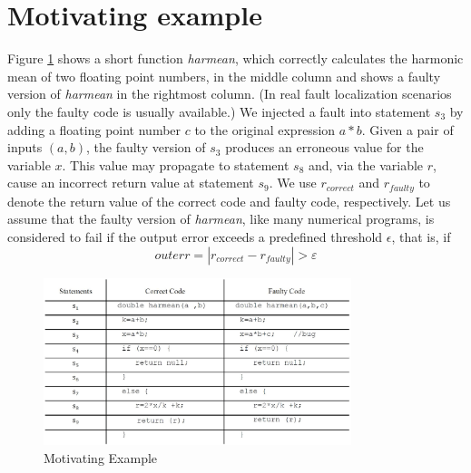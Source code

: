\documentclass[times]{stvrauth}
\begin{document}
\section{Motivating example}\label{motivating}
\vspace{-2pt}

Figure \ref{code} shows a short function {\it harmean}, which correctly calculates the harmonic mean of two floating point numbers, in the middle column and shows a faulty version of {\it harmean} in the rightmost column.  (In real fault localization scenarios only the faulty code is usually available.)  We injected a fault into statement $s_3$ by adding a floating point number $c$ to the original expression $a*b$.  Given a pair of inputs $(a,b)$, the faulty version of $s_3$ produces an erroneous value for the variable $x$.  This value may propagate to statement $s_8$ and, via the variable $r$, cause an incorrect return value at statement $s_9$.  We use $r_{correct}$ and $r_{faulty}$ to denote the return value of the correct code and faulty code, respectively.  Let us assume that the faulty version of {\it harmean}, like many numerical programs, is considered to fail if the output error exceeds a predefined threshold $\epsilon$, that is, if
\begin{equation*}\label{threshold}
outerr = |{r_{correct}} - {r_{faulty}}| > \varepsilon
\end{equation*}

\begin{figure}[!thpb]
\centering
\includegraphics[width=0.8\textwidth]{MotivatingExample.eps}
\caption{Motivating Example}
\label{code}
\end{figure}
\end{document}

